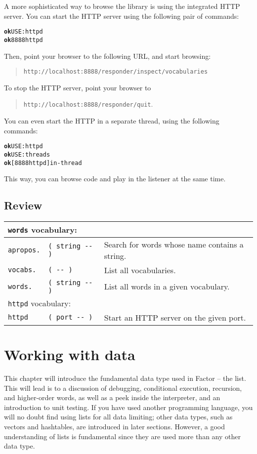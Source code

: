 \documentclass[english]{book}
\newcommand{\wordtable}[1]{{
\begin{tabularx}{12cm}{|l l X|}
#1
\hline
\end{tabularx}}}
\newcommand{\tabvocab}[1]{
\hline
\multicolumn{3}{|l|}{
\rule[-2mm]{0mm}{6mm}
\texttt{#1} vocabulary:}
\\
\hline
}
\begin{document}
A more sophisticated way to browse the library is using the integrated HTTP server. You can start the HTTP server using the following pair of commands:

\begin{alltt}
\textbf{ok} USE: httpd
\textbf{ok} 8888 httpd
\end{alltt}

Then, point your browser to the following URL, and start browsing:

\begin{quote}
\texttt{http://localhost:8888/responder/inspect/vocabularies}
\end{quote}

To stop the HTTP server, point your browser to

\begin{quote}
\texttt{http://localhost:8888/responder/quit}.
\end{quote}

You can even start the HTTP in a separate thread, using the following commands:

\begin{alltt}
\textbf{ok} USE: httpd
\textbf{ok} USE: threads
\textbf{ok} [ 8888 httpd ] in-thread
\end{alltt}

This way, you can browse code and play in the listener at the same time.

\section*{Review}

\wordtable{
\tabvocab{words}
\texttt{apropos.}&
\texttt{( string -{}- )}&
Search for words whose name contains a string.\\
\texttt{vocabs.}&
\texttt{( -{}- )}&
List all vocabularies.\\
\texttt{words.}&
\texttt{( string -{}- )}&
List all words in a given vocabulary.\\
\tabvocab{httpd}
\texttt{httpd}&
\texttt{( port -{}- )}&
Start an HTTP server on the given port.\\
}

\chapter{Working with data}

This chapter will introduce the fundamental data type used in Factor -- the list.
This will lead is to a discussion of debugging, conditional execution, recursion, and higher-order words, as well as a peek inside the interpreter, and an introduction to unit testing. If you have used another programming language, you will no doubt find using lists for all data limiting; other data types, such as vectors and hashtables, are introduced in later sections. However, a good understanding of lists is fundamental since they are used more than any other data type. 
\end{document}
